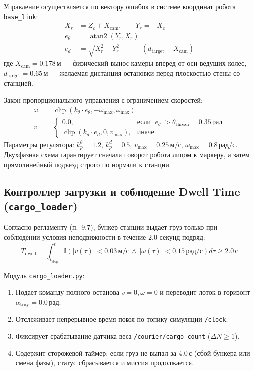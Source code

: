 \documentclass[a4paper,11pt]{article}
\begin{document}
Управление осуществляется по вектору ошибок в системе координат робота \texttt{base\_link}:
\begin{align}
X_r &= Z_c + X_{\text{cam}}, \qquad Y_r = -X_c \\
e_\theta &= \operatorname{atan2}(Y_r, X_r) \\
e_d &= \sqrt{X_r^2 + Y_r^2} --- (d_{\text{target}} + X_{\text{cam}})
\end{align}
где $X_{\text{cam}} = 0.178$\,м — физический вынос камеры вперед от оси ведущих колес, $d_{\text{target}} = 0.65$\,м — желаемая дистанция остановки перед плоскостью стены со станцией.

Закон пропорционального управления с ограничением скоростей:
\begin{align}
\omega &= \operatorname{clip}(k_\theta \cdot e_\theta, -\omega_{\text{max}}, \omega_{\text{max}}) \\
v &= \begin{cases} 
0.0, & \text{если } |e_\theta| > \theta_{\text{thresh}} = 0.35\,\text{рад} \\
\operatorname{clip}(k_d \cdot e_d, 0, v_{\text{max}}), & \text{иначе}
\end{cases}
\end{align}
Параметры регулятора: $k_p^\theta = 1.2$, $k_p^d = 0.5$, $v_{\text{max}} = 0.25$\,м/с, $\omega_{\text{max}} = 0.8$\,рад/с. Двухфазная схема гарантирует сначала поворот робота лицом к маркеру, а затем прямолинейный подъезд строго по нормали к станции.

\subsection{Контроллер загрузки и соблюдение Dwell Time (\texttt{cargo\_loader})}
Согласно регламенту (п.~9.7), бункер станции выдает груз только при соблюдении условия неподвижности в течение 2.0 секунд подряд:
\begin{equation}
T_{\text{dwell}} = \int_{t_{\text{stop}}}^{t} \mathbb{I}\left( |v(\tau)| < 0.03\,\text{м/с} \ \land \ |\omega(\tau)| < 0.15\,\text{рад/с} \right) d\tau \ge 2.0\,\text{с}
\end{equation}

Модуль \texttt{cargo\_loader.py}:
\begin{enumerate}
    \item Подает команду полного останова $v=0, \omega=0$ и переводит лоток в горизонт $\alpha_{\text{tray}} = 0.0$\,рад.
    \item Отслеживает непрерывное время покоя по топику симуляции \texttt{/clock}.
    \item Фиксирует срабатывание датчика веса \texttt{/courier/cargo\_count} ($\Delta N \ge 1$).
    \item Содержит сторожевой таймер: если груз не выпал за 4.0\,с (сбой бункера или смена фазы), статус сбрасывается и миссия продолжается.
\end{enumerate}
\end{document}
